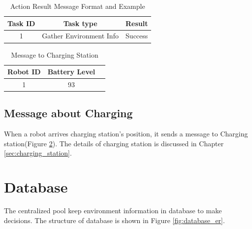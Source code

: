 \begin{table}[htb]
\centering
\begin{tabular}{|c|c|c|} 
\hline
Task ID 	& Task type	& Result\\
\hline\hline
1 & Gather Environment Info & Success \\ [1ex] 
\hline
\end{tabular}
\caption{Action Result Message Format and Example}
\label{tab:result_message}
\end{table}


\begin{table}[htb]
\centering
\begin{tabular}{|c|c|c|} 
\hline
Robot ID & Battery Level \\
\hline\hline
1 & 93 \\ [1ex] 
\hline
\end{tabular}
\caption{Message to Charging Station}
\label{tab:message_to_charging_staion}
\end{table}

\subsection{Message about Charging}
  
When a robot arrives charging station's position, it sends a message to Charging station(Figure \ref{tab:message_to_charging_staion}). The details of charging station is discussed in Chapter \ref{sec:charging_station}. 

\section{Database}
The centralized pool keep environment information in database to make decisions. The structure of database is shown in Figure \ref{fig:database_er}.


